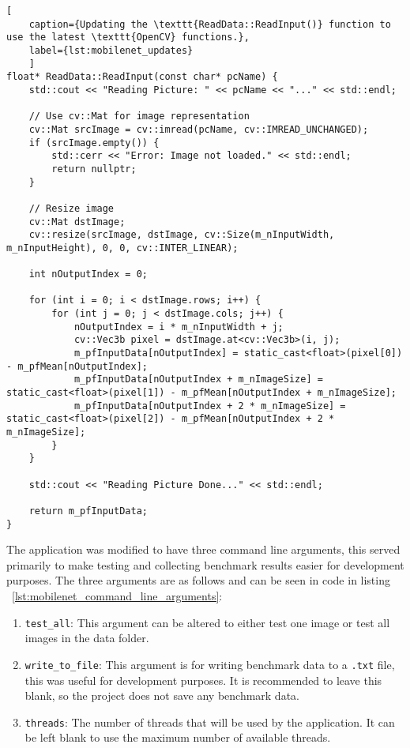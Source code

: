 \begin{lstlisting}[
	caption={Updating the \texttt{ReadData::ReadInput()} function to use the latest \texttt{OpenCV} functions.},
	label={lst:mobilenet_updates}
	]
float* ReadData::ReadInput(const char* pcName) {
	std::cout << "Reading Picture: " << pcName << "..." << std::endl;
	
	// Use cv::Mat for image representation
	cv::Mat srcImage = cv::imread(pcName, cv::IMREAD_UNCHANGED);
	if (srcImage.empty()) {
		std::cerr << "Error: Image not loaded." << std::endl;
		return nullptr;
	}
	
	// Resize image
	cv::Mat dstImage;
	cv::resize(srcImage, dstImage, cv::Size(m_nInputWidth, m_nInputHeight), 0, 0, cv::INTER_LINEAR);
	
	int nOutputIndex = 0;
	
	for (int i = 0; i < dstImage.rows; i++) {
		for (int j = 0; j < dstImage.cols; j++) {
			nOutputIndex = i * m_nInputWidth + j;
			cv::Vec3b pixel = dstImage.at<cv::Vec3b>(i, j);
			m_pfInputData[nOutputIndex] = static_cast<float>(pixel[0]) - m_pfMean[nOutputIndex];
			m_pfInputData[nOutputIndex + m_nImageSize] = static_cast<float>(pixel[1]) - m_pfMean[nOutputIndex + m_nImageSize];
			m_pfInputData[nOutputIndex + 2 * m_nImageSize] = static_cast<float>(pixel[2]) - m_pfMean[nOutputIndex + 2 * m_nImageSize];
		}
	}
	
	std::cout << "Reading Picture Done..." << std::endl;
	
	return m_pfInputData;
}
\end{lstlisting}

The application was modified to have three command line arguments, this served primarily to make testing and collecting benchmark results easier for development purposes. The three arguments are as follows and can be seen in code in listing ~\ref{lst:mobilenet_command_line_arguments}:

\begin{enumerate}
	\item \texttt{test\_all}: This argument can be altered to either test one image or test all images in the data folder.  
	\item \texttt{write\_to\_file}: This argument is for writing benchmark data to a \texttt{.txt} file, this was useful for development purposes. It is recommended to leave this blank, so the project does not save any benchmark data. 
	\item \texttt{threads}: The number of threads that will be used by the application. It can be left blank to use the maximum number of available threads.  
\end{enumerate}

